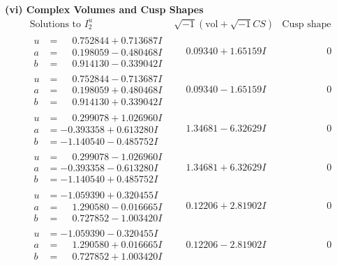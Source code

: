 \documentclass[1p]{elsarticle_modified}
\theoremstyle{definition}
\newcommand{\I}{\sqrt{-1}}
\begin{document}
\newpage\flushleft \textbf{(vi) Complex Volumes and Cusp Shapes}
$$\begin{array}{c|c|c}  
\text{Solutions to }I^u_{2}& \I (\text{vol} + \sqrt{-1}CS) & \text{Cusp shape}\\
 \hline 
\begin{aligned}
u &= \phantom{-}0.752844 + 0.713687 I \\
a &= \phantom{-}0.198059 - 0.480468 I \\
b &= \phantom{-}0.914130 - 0.339042 I\end{aligned}
 & \phantom{-}0.09340 + 1.65159 I & \phantom{-0.000000 } 0 \\ \hline\begin{aligned}
u &= \phantom{-}0.752844 - 0.713687 I \\
a &= \phantom{-}0.198059 + 0.480468 I \\
b &= \phantom{-}0.914130 + 0.339042 I\end{aligned}
 & \phantom{-}0.09340 - 1.65159 I & \phantom{-0.000000 } 0 \\ \hline\begin{aligned}
u &= \phantom{-}0.299078 + 1.026960 I \\
a &= -0.393358 + 0.613280 I \\
b &= -1.140540 - 0.485752 I\end{aligned}
 & \phantom{-}1.34681 - 6.32629 I & \phantom{-0.000000 } 0 \\ \hline\begin{aligned}
u &= \phantom{-}0.299078 - 1.026960 I \\
a &= -0.393358 - 0.613280 I \\
b &= -1.140540 + 0.485752 I\end{aligned}
 & \phantom{-}1.34681 + 6.32629 I & \phantom{-0.000000 } 0 \\ \hline\begin{aligned}
u &= -1.059390 + 0.320455 I \\
a &= \phantom{-}1.290580 - 0.016665 I \\
b &= \phantom{-}0.727852 - 1.003420 I\end{aligned}
 & \phantom{-}0.12206 + 2.81902 I & \phantom{-0.000000 } 0 \\ \hline\begin{aligned}
u &= -1.059390 - 0.320455 I \\
a &= \phantom{-}1.290580 + 0.016665 I \\
b &= \phantom{-}0.727852 + 1.003420 I\end{aligned}
 & \phantom{-}0.12206 - 2.81902 I & \phantom{-0.000000 } 0 \\ \hline\begin{aligned}

\end{aligned}
\end{array}$$
\end{document}
